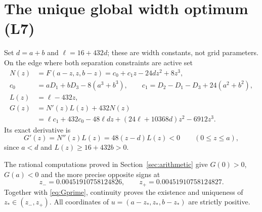 \documentclass[review,supplement,hidelinks,onefignum,onetabnum]{siamart251216}
\begin{document}
\section{The unique global width optimum (L7)}\label{sec:width}
Set $d=a+b$ and $\ell=16+432d$; these are width constants, not grid
parameters. On the edge where both separation constraints are active set
\begin{align}
N(z)&=F(a-z,z,b-z)=c_0+c_1z-24dz^2+8z^3,\nonumber\\
c_0&=aD_1+bD_3-8(a^3+b^3),\qquad
c_1=D_2-D_1-D_3+24(a^2+b^2),\nonumber\\
L(z)&=\ell-432z,\nonumber\\
G(z)&=N'(z)L(z)+432N(z)\label{eq:G}\\
&=\ell c_1+432c_0-48\ell dz+(24\ell+10368d)z^2-6912z^3.\nonumber
\end{align}
Its exact derivative is
\begin{equation}\label{eq:Gprime}
G'(z)=N''(z)L(z)=48(z-d)L(z)<0\qquad(0\le z\le a),
\end{equation}
since $a<d$ and $L(z)\ge16+432b>0$.

The rational computations proved in Section~\ref{sec:arithmetic} give
$G(0)>0$, $G(a)<0$ and the more precise opposite signs at
\begin{equation}\label{eq:zbracket}
z_-=0.00451910758124826,\qquad z_+=0.00451910758124827.
\end{equation}
Together with \eqref{eq:Gprime}, continuity proves the existence and
uniqueness of $z_*\in(z_-,z_+)$. All coordinates of
$u=(a-z_*,z_*,b-z_*)$ are strictly positive.
\end{document}
